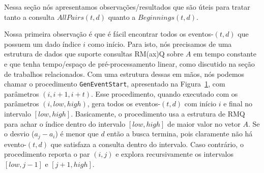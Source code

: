 \documentclass[dissertacao, brazil]{ThesisPUC}
\begin{document}
Nessa seção nós apresentamos observações/resultados que são úteis para tratar
tanto a consulta $AllPairs(t, d)$ quanto a $Beginnings(t, d)$.

Nossa primeira observação é que é fácil encontrar todos os eventos-$(t,d)$ que possuem
um dado índice $i$ como início. Para isto, nós precisamos de uma estrutura de dados que
suporte consultas RM(ax)Q sobre $A$ em tempo constante e que tenha tempo/espaço de pré-processamento linear,
como discutido na seção de trabalhos relacionados. Com uma estrutura dessas em mãos, nós podemos
chamar o procedimento {\tt GenEventStart}, apresentado na Figura~\ref{geneventstart}, com parâmetros
$(i, i + 1, i + t)$. Esse procedimento, quando executado com os parâmetros $(i, low, high)$, gera
todos os eventos-$(t,d)$ com início $i$ e final no intervalo $[low, high]$. Basicamente, o procedimento
usa a estrutura de RMQ para achar o índice dentro do intervalo $[low, high]$ de maior valor no 
vetor $A$. Se o desvio ($a_j - a_i$) é menor que $d$ então a busca termina, pois claramente não
há evento-$(t,d)$ que satisfaza a consulta dentro do intervalo. Caso contrário, o procedimento reporta
o par $(i, j)$ e explora recursivamente os intervalos $[low, j - 1]$ e $[j + 1, high]$.
 
\begin{figure}
\label{geneventstart}
\end{figure}
\end{document}
